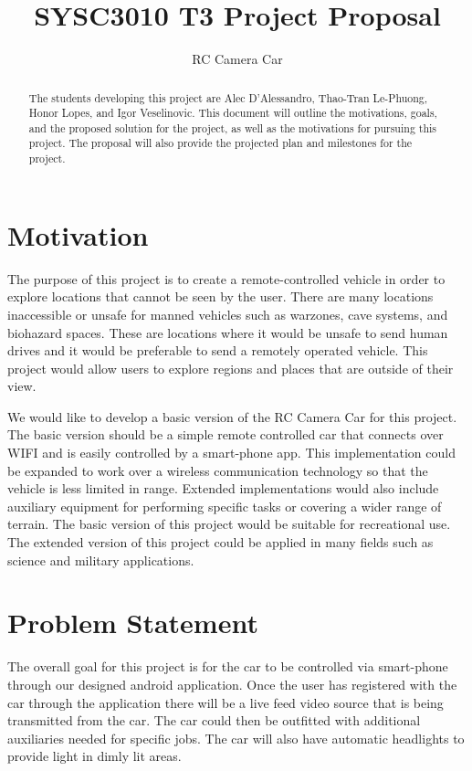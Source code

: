 \documentclass[letterpaper,12pt]{report}
\begin{document}
	\title{SYSC3010 T3 Project Proposal}
	\author{RC Camera Car}
	\date{}
	\maketitle

	\begin{abstract}
		The students developing this project are Alec D'Alessandro, Thao-Tran
		Le-Phuong, Honor Lopes, and Igor Veselinovic. This document will outline
		the motivations, goals, and the proposed solution for the project, as
		well as the motivations for pursuing this project. The proposal will
		also provide the projected plan and milestones for the project.
	\end{abstract}

	\tableofcontents

	\pagebreak

	\section*{Motivation}
	\markright{}
	The purpose of this project is to create a remote-controlled vehicle in 
	order to explore locations that cannot be seen by the user. There are many
	locations inaccessible or unsafe for manned vehicles such as warzones, cave
	systems, and biohazard spaces. These are locations where it would be unsafe
	to send human drives and it would be preferable to send a remotely operated
	vehicle. This project would allow users to explore regions and places that
	are outside of their view.

	We would like to develop a basic version of the RC Camera Car for this
	project. The basic version should be a simple remote 	controlled car that
	connects over WIFI and is easily controlled by a smart-phone app. This
	implementation could be expanded to work over a wireless communication
	technology so that the vehicle is less limited in range. Extended
	implementations would also include auxiliary equipment for performing 
	specific tasks or covering a wider range of terrain. The basic version of 
	this project would be suitable for recreational use. The extended version of
	this project could be applied in many fields such as science and military 
	applications.


	\section*{Problem Statement}
	\markright{}
	The overall goal for this project is for the car to be controlled via
	smart-phone through our designed android application. Once the user has
	registered with the car through the application there will be a live feed
	video source that is being transmitted from the car. The car could then be
	outfitted with additional auxiliaries needed for specific jobs. The car will
	also have automatic headlights to provide light in dimly lit areas.
\end{document}
